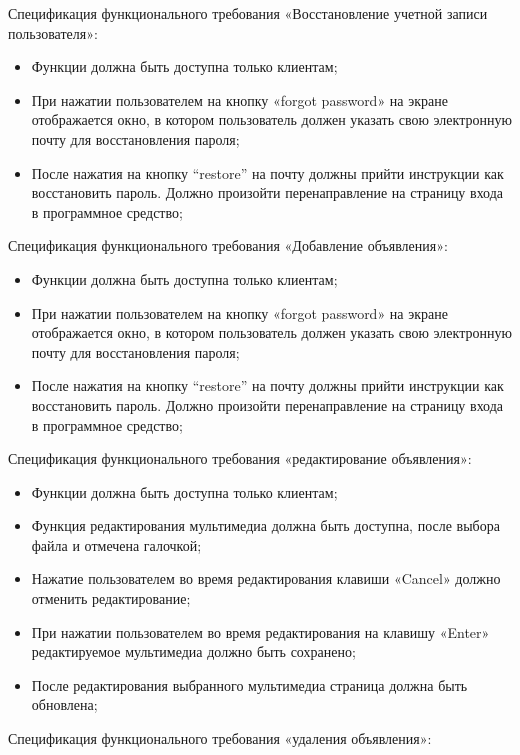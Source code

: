 Спецификация функционального требования «Восстановление учетной записи пользователя»:

\begin{itemize}
	\item Функции должна быть доступна только клиентам;
	\item При нажатии пользователем на кнопку «forgot password» на экране отображается окно, в котором пользователь должен указать свою  электронную почту для восстановления пароля;
	\item После нажатия на кнопку “restore” на почту должны прийти инструкции как восстановить пароль. Должно произойти перенаправление на страницу входа в программное средство; 
\end{itemize}


Спецификация функционального требования «Добавление объявления»:

\begin{itemize}
	\item Функции должна быть доступна только клиентам;
	\item При нажатии пользователем на кнопку «forgot password» на экране отображается окно, в котором пользователь должен указать свою  электронную почту для восстановления пароля;
	\item  После нажатия на кнопку “restore” на почту должны прийти инструкции как восстановить пароль. Должно произойти перенаправление на страницу входа в программное средство;
\end{itemize}

Спецификация функционального требования «редактирование объявления»:

\begin{itemize}
	\item Функции должна быть доступна только клиентам;
	\item Функция редактирования мультимедиа должна быть доступна, после выбора файла и отмечена галочкой;
	\item Нажатие пользователем во время редактирования клавиши «Cancel» должно отменить редактирование;
	\item При нажатии пользователем во время редактирования на клавишу «Enter» редактируемое мультимедиа должно быть сохранено;
	\item После редактирования выбранного мультимедиа страница должна быть обновлена;
\end{itemize}

Спецификация функционального требования «удаления  объявления»:

